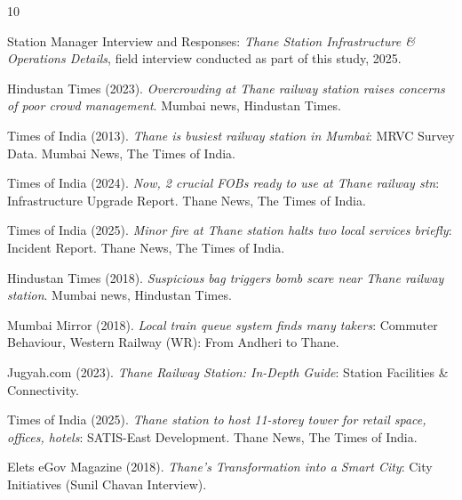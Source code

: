 \documentclass[11pt]{article}
\begin{document}
\begin{thebibliography}{10}

Station Manager Interview and Responses: \textit{Thane Station Infrastructure \& Operations
Details}, field interview conducted as part of this study, 2025.

Hindustan Times (2023). \textit{Overcrowding at Thane railway station raises concerns of poor
crowd management}. Mumbai news, Hindustan Times.

Times of India (2013). \textit{Thane is busiest railway station in Mumbai}: MRVC Survey Data.
Mumbai News, The Times of India.

Times of India (2024). \textit{Now, 2 crucial FOBs ready to use at Thane railway stn}:
Infrastructure Upgrade Report. Thane News, The Times of India.

Times of India (2025). \textit{Minor fire at Thane station halts two local services briefly}:
Incident Report. Thane News, The Times of India.

Hindustan Times (2018). \textit{Suspicious bag triggers bomb scare near Thane railway station}.
Mumbai news, Hindustan Times.

Mumbai Mirror (2018). \textit{Local train queue system finds many takers}: Commuter Behaviour,
Western Railway (WR): From Andheri to Thane.

Jugyah.com (2023). \textit{Thane Railway Station: In-Depth Guide}: Station Facilities \&
Connectivity.

Times of India (2025). \textit{Thane station to host 11-storey tower for retail space, offices,
hotels}: SATIS-East Development. Thane News, The Times of India.

Elets eGov Magazine (2018). \textit{Thane's Transformation into a Smart City}: City
Initiatives (Sunil Chavan Interview).

\end{thebibliography}
\end{document}
